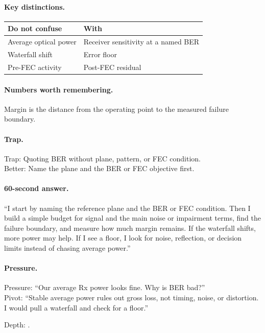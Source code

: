 \paragraph{Key distinctions.}
\begin{center}
\footnotesize
\begin{tabular}{@{}ll@{}}
\toprule
Do not confuse & With \\
\midrule
Average optical power & Receiver sensitivity at a named BER \\
Waterfall shift & Error floor \\
Pre-FEC activity & Post-FEC residual \\
\bottomrule
\end{tabular}
\end{center}

\paragraph{Numbers worth remembering.}
Margin is the distance from the operating point to the measured failure
boundary.

\paragraph{Trap.}
Trap: Quoting BER without plane, pattern, or FEC condition.\\
Better: Name the plane and the BER or FEC objective first.

\paragraph{60-second answer.}
``I start by naming the reference plane and the BER or FEC condition. Then I
build a simple budget for signal and the main noise or impairment terms, find
the failure boundary, and measure how much margin remains. If the waterfall
shifts, more power may help. If I see a floor, I look for noise, reflection, or
decision limits instead of chasing average power.''

\paragraph{Pressure.}
Pressure: ``Our average Rx power looks fine. Why is BER bad?''\\
Pivot: ``Stable average power rules out gross loss, not timing, noise, or
distortion. I would pull a waterfall and check for a floor.''

\footnotesize Depth: .

